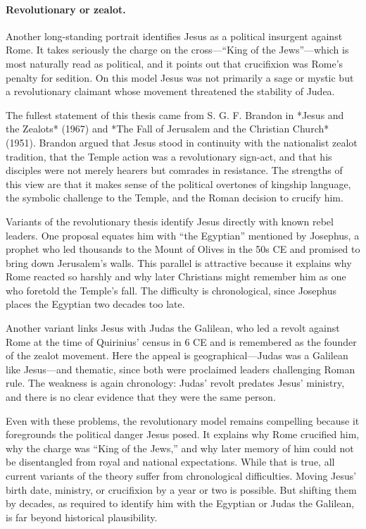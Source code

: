 \paragraph{Revolutionary or zealot.}

Another long-standing portrait identifies Jesus as a political insurgent against Rome.
It takes seriously the charge on the cross—“King of the Jews”—which is most naturally read as political, and it points out that crucifixion was Rome’s penalty for sedition.
On this model Jesus was not primarily a sage or mystic but a revolutionary claimant whose movement threatened the stability of Judea.

The fullest statement of this thesis came from S. G. F. Brandon in *Jesus and the Zealots* (1967) and *The Fall of Jerusalem and the Christian Church* (1951).
Brandon argued that Jesus stood in continuity with the nationalist zealot tradition, that the Temple action was a revolutionary sign-act, and that his disciples were not merely hearers but comrades in resistance.
The strengths of this view are that it makes sense of the political overtones of kingship language, the symbolic challenge to the Temple, and the Roman decision to crucify him.

Variants of the revolutionary thesis identify Jesus directly with known rebel leaders.
One proposal equates him with “the Egyptian” mentioned by Josephus, a prophet who led thousands to the Mount of Olives in the 50s CE and promised to bring down Jerusalem’s walls.
This parallel is attractive because it explains why Rome reacted so harshly and why later Christians might remember him as one who foretold the Temple’s fall.
The difficulty is chronological, since Josephus places the Egyptian two decades too late.

Another variant links Jesus with Judas the Galilean, who led a revolt against Rome at the time of Quirinius’ census in 6 CE and is remembered as the founder of the zealot movement.
Here the appeal is geographical—Judas was a Galilean like Jesus—and thematic, since both were proclaimed leaders challenging Roman rule.
The weakness is again chronology: Judas’ revolt predates Jesus’ ministry, and there is no clear evidence that they were the same person.

Even with these problems, the revolutionary model remains compelling because it foregrounds the political danger Jesus posed.
It explains why Rome crucified him, why the charge was “King of the Jews,” and why later memory of him could not be disentangled from royal and national expectations.
While that is true, all current variants of the theory suffer from chronological difficulties.
Moving Jesus’ birth date, ministry, or crucifixion by a year or two is possible.
But shifting them by decades, as required to identify him with the Egyptian or Judas the Galilean, is far beyond historical plausibility.

